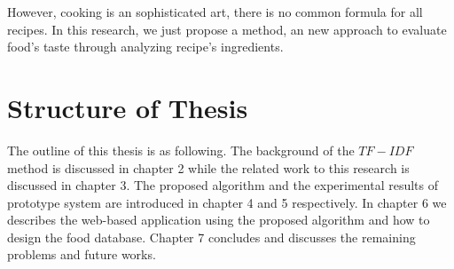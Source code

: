 However, cooking is an sophisticated art, there is no common formula for all recipes. In this research, we just propose a method, an new approach to evaluate food's taste through analyzing recipe's ingredients.

\section{Structure of Thesis}\label{sec:intro_structure}

\par The outline of this thesis is as following. The background of the $TF-IDF$ method is discussed in chapter 2 while the related work to this research is discussed in chapter 3. The proposed algorithm and the experimental results of prototype system are introduced in chapter 4 and 5 respectively. In chapter 6 we describes the web-based application using the proposed algorithm and how to design the food database. Chapter 7 concludes and discusses the remaining problems and future works.

 